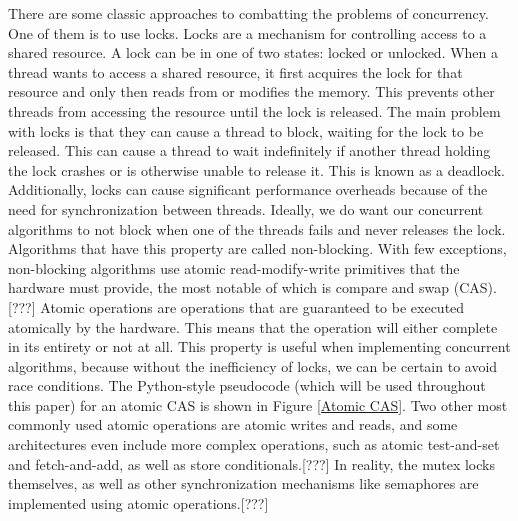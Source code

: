 \documentclass[oneside, a4paper, onecolumn, 10pt]{article}
\begin{document}
There are some classic approaches to combatting the problems of concurrency. One of them is to use locks. Locks are a mechanism for controlling access to a shared resource. A lock can be in one of two states: locked or unlocked. When a thread wants to access a shared resource, it first acquires the lock for that resource and only then reads from or modifies the memory. This prevents other threads from accessing the resource until the lock is released. The main problem with locks is that they can cause a thread to block, waiting for the lock to be released. This can cause a thread to wait indefinitely if another thread holding the lock crashes or is otherwise unable to release it. This is known as a deadlock. Additionally, locks can cause significant performance overheads because of the need for synchronization between threads.
Ideally, we do want our concurrent algorithms to not block when one of the threads fails and never releases the lock. Algorithms that have this property are called non-blocking. With few exceptions, non-blocking algorithms use atomic read-modify-write primitives that the hardware must provide, the most notable of which is compare and swap (CAS).[???] Atomic operations are operations that are guaranteed to be executed atomically by the hardware. This means that the operation will either complete in its entirety or not at all. This property is useful when implementing concurrent algorithms, because without the inefficiency of locks, we can be certain to avoid race conditions. The Python-style pseudocode (which will be used throughout this paper) for an atomic CAS is shown in Figure \ref{Atomic CAS}. Two other most commonly used atomic operations are atomic writes and reads, and some architectures even include more complex operations, such as atomic test-and-set and fetch-and-add, as well as store conditionals.[???] In reality, the mutex locks themselves, as well as other synchronization mechanisms like semaphores are implemented using atomic operations.[???]\\
\end{document}
